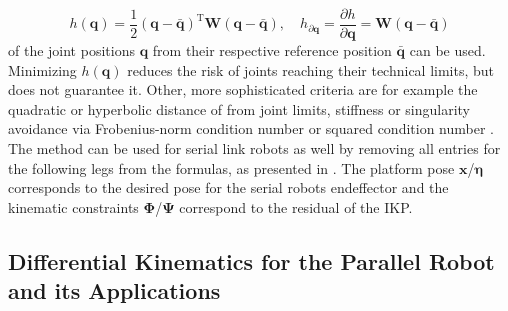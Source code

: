 \documentclass[robotics,article,submit,moreauthors,pdftex]{Definitions/mdpi}
\newcommand{\bm}[1]{\boldsymbol{#1}}
\newcommand{\transp}[0]{{\mathrm{T}}}
\begin{document}
%
\begin{equation}
h(\bm{q})
=
\frac{1}{2} (\bm{q}-\bar{\bm{q}})^\transp\bm{W}(\bm{q}-\bar{\bm{q}}),
\quad
h_{\partial\bm{q}}
=
\frac{\partial h}{\partial \bm{q}}
=
\bm{W}(\bm{q}-\bar{\bm{q}})
\end{equation}
of the joint positions $\bm{q}$ from their respective reference position $\bar{\bm{q}}$ can be used.
Minimizing $h(\bm{q})$ reduces the risk of joints reaching their technical limits, but does not guarantee it.
Other, more sophisticated criteria are for example the quadratic \cite{HuoBar2005} or hyperbolic \cite{ZhuQuCaoYan2013} distance of from joint limits, stiffness \cite{GuoDonKe2015} or singularity avoidance via Frobenius-norm condition number \cite{ZhuQuCaoYan2013} or squared condition number \cite{LegerAng2016}.
The method can be used for serial link robots as well by removing all entries for the following legs from the formulas, as presented in \cite{1_SchapplerTapOrt2019}.
The platform pose $\bm{x}$/$\bm{\eta}$ corresponds to the desired pose for the serial robots endeffector and the kinematic constraints $\bm{\Phi}$/$\bm{\Psi}$ correspond to the residual of the IKP.

\subsection{Differential Kinematics for the Parallel Robot and its Applications}
\end{document}

